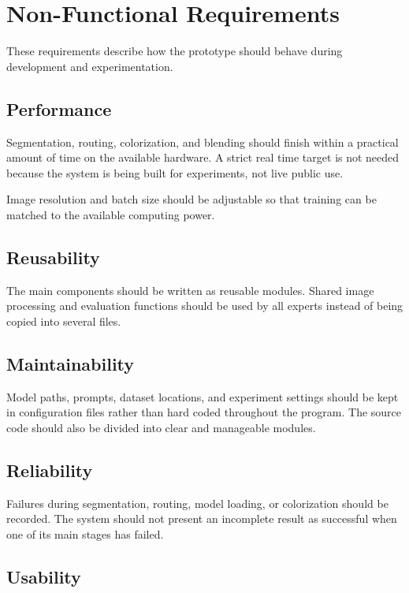 \documentclass{FastFyp}
\begin{document}
\section{Non-Functional Requirements}

These requirements describe how the prototype should behave during development and experimentation.

\subsection{Performance}

Segmentation, routing, colorization, and blending should finish within a practical amount of time on the available hardware. A strict real time target is not needed because the system is being built for experiments, not live public use.

Image resolution and batch size should be adjustable so that training can be matched to the available computing power.

\subsection{Reusability}

The main components should be written as reusable modules. Shared image processing and evaluation functions should be used by all experts instead of being copied into several files.

\subsection{Maintainability}

Model paths, prompts, dataset locations, and experiment settings should be kept in configuration files rather than hard coded throughout the program. The source code should also be divided into clear and manageable modules.

\subsection{Reliability}

Failures during segmentation, routing, model loading, or colorization should be recorded. The system should not present an incomplete result as successful when one of its main stages has failed.

\subsection{Usability}
\end{document}
